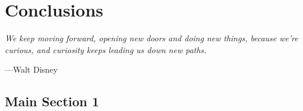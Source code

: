 
\chapter{Conclusions} %

\label{Chapter6} %


\epigraph{\itshape We keep moving forward, opening new doors and doing new things, because we're curious, and curiosity keeps leading us down new paths.}{---Walt Disney}

\section{Main Section 1}

\lipsum[1-3]